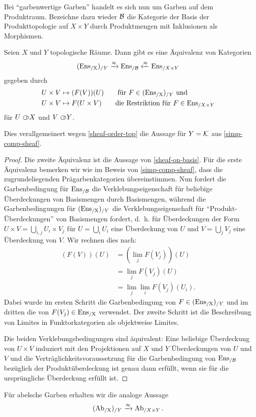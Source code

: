Bei ``garbenwertige Garben'' handelt es sich nun um Garben auf dem
Produktraum. Bezeichne dazu wieder $\mathcal{B}$ die Kategorie der Basis der
Produkttopologie auf $X \times Y$ durch Produktmengen mit Inklusionen
als Morphismen.
\begin{satz} \label{sheaves-prod-topos}
  Seien $X$ und $Y$ topologische Räume. Dann gibt es eine Äquivalenz
  von Kategorien
  \[ (\operatorname{Ens_{/X}})_{/Y} \xrightarrow{\approx} \operatorname{Ens}_{/\mathcal{B}} \xleftarrow{\approx} \operatorname{Ens}_{/X \times Y} \]
  gegeben durch
  \begin{align*}
    U \times V &\mapsto (F(V))(U) \qquad
    \text{für } F \in (\operatorname{Ens_{/X}})_{/Y} \text{ und} \\
     U \times V &\mapsto F(U \times V) \qquad
     \text{die Restriktion für } F \in \operatorname{Ens}_{/X \times Y}
  \end{align*}
  für $U \subset\kern-0.58em\circ X$ und $V \subset\kern-0.58em\circ Y$.
\end{satz}
\begin{bem}
  Dies verallgemeinert wegen \ref{sheaf-order-top} die Aussage für $Y
  = \mathcal{K}$ aus \ref{simp-comp-sheaf}.
\end{bem}
\begin{proof}
  Die zweite Äquivalenz ist die Aussage von \ref{sheaf-on-basis}. Für
  die erste Äquivalenz bemerken wir wie im Beweis von
  \ref{simp-comp-sheaf}, dass die zugrundeliegenden
  Prägarbenkategorien übereinstimmen. Nun fordert die Garbenbedingung
  für $\operatorname{Ens}_{/\mathcal{B}}$ die Verklebungseigenschaft für beliebige
  Überdeckungen von Basismengen durch Basismengen, während die
  Garbenbedingungen für $(\operatorname{Ens_{/X}})_{/Y}$ die Verklebungseigenschaft für
  ``Produkt-Überdeckungen'' von Basismengen fordert, d.~h. für
  Überdeckungen der Form $U \times V = \bigcup_{i,j} U_i \times V_j$
  für $U = \bigcup_i U_i$ eine Überdeckung von $U$ und $V = \bigcup_j
  V_j$ eine Überdeckung von $V$. Wir rechnen dies nach:
  \begin{align*}
    (F(V))(U)
    &= (\lim_j F(V_j))(U) \\
    &= \lim_j F(V_j)(U) \\
    &= \lim_j \lim_i F(V_j)(U_i).
  \end{align*}
  Dabei wurde im ersten Schritt die Garbenbedingung von $F \in
  (\operatorname{Ens_{/X}})_{/Y}$ und im dritten die von $F(V_j) \in \operatorname{Ens_{/X}}$
  verwendet. Der zweite Schritt ist die Beschreibung von Limites in
  Funktorkategorien als objektweise Limites.

  Die beiden Verklebungsbedingungen sind äquivalent: Eine beliebige
  Überdeckung von $U \times V$ induziert mit den Projektionen auf $X$
  und $Y$ Überdeckungen von $U$ und $V$ und die
  Verträglichkeitsvoraussetzung für die Garbenbedingung von
  $\operatorname{Ens}_{/\mathcal{B}}$ bezüglich der Produktüberdeckung ist genau dann
  erfüllt, wenn sie für die ursprüngliche Überdeckung erfüllt ist.
\end{proof}
\begin{bem}
  Für abelsche Garben erhalten wir die analoge Aussage
  \[ (\operatorname{Ab_{/X}})_{/Y} \xrightarrow{\approx} \operatorname{Ab}_{/X \times Y} . \]
\end{bem}


